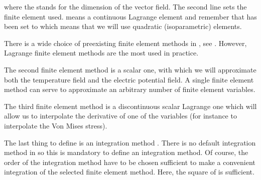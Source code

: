 \documentclass[a4paper,11pt,english]{sphinxmanual}
\begin{document}
\begin{sphinxVerbatim}[commandchars=\\\{\}]
  
\end{sphinxVerbatim}

\sphinxAtStartPar
where the  stands for the dimension of the vector field. The second line sets the finite element used.  means a continuous Lagrange element and remember that  has been set to  which means that we will use quadratic (isoparametric) elements.

\sphinxAtStartPar
There is a wide choice of pre\sphinxhyphen{}existing finite element methods in , see . However, Lagrange finite element methods are the most used in practice.

\sphinxAtStartPar
The second finite element method is a scalar one,  with which we will approximate both the temperature field and the electric potential field. A single finite element method can serve to approximate an arbitrary number of finite element variables.

\sphinxAtStartPar
The third finite element method is a discontinuous scalar Lagrange one which will allow us to interpolate the derivative of one of the variables (for instance to interpolate the Von Mises stress).

\sphinxAtStartPar
The last thing to define is an integration method . There is no default integration method in  so this is mandatory to define an integration method. Of course, the order of the integration method have to be chosen sufficient to make a convenient integration of the selected finite element method. Here, the square of  is sufficient.
\end{document}
